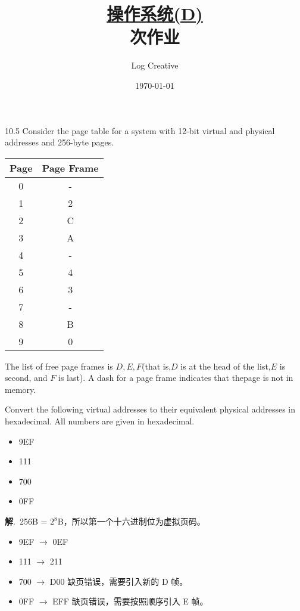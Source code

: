 \documentclass[12pt,a4paper]{article}
\newenvironment{problems}{\begin{list}{}{\renewcommand{\makelabel}[1]{\textbf{##1}\hfil}}}{\end{list}}
\providecommand{\sol}{\textbf{解}.~}
\begin{document}
\title{\normalsize \underline{操作系统(D)}\\ 次作业}
\author{Log Creative }
\date{\today}
\maketitle

\begin{problems}
    \item[10.5] Consider the page table for a system with 12-bit virtual and physical addresses and 256-byte pages.
    
    \begin{tabular}{cc}
        \hline
        Page & Page Frame \\
        \hline
        0 & - \\
        1 & 2 \\
        2 & C \\
        3 & A \\
        4 & - \\
        5 & 4 \\
        6 & 3 \\
        7 & - \\
        8 & B \\
        9 & 0 \\
        \hline
    \end{tabular}

    The list of free page frames is $D,E,F$(that is,$D$ is at the head of the list,$E$ is second, and $F$ is last). A dash for a page frame indicates that thepage is not in memory.
    
    Convert the following virtual addresses to their equivalent physical addresses in hexadecimal. All numbers are given in hexadecimal.

    \begin{itemize}
        \item 9EF
        \item 111
        \item 700
        \item 0FF
    \end{itemize}

    \sol 256B = $2^8$B，所以第一个十六进制位为虚拟页码。

    \begin{itemize}
        \item 9EF $\rightarrow$ 0EF
        \item 111 $\rightarrow$ 211
        \item 700 $\rightarrow$ D00 缺页错误，需要引入新的 D 帧。
        \item 0FF $\rightarrow$ EFF 缺页错误，需要按照顺序引入 E 帧。
    \end{itemize}


\end{problems}
\end{document}
